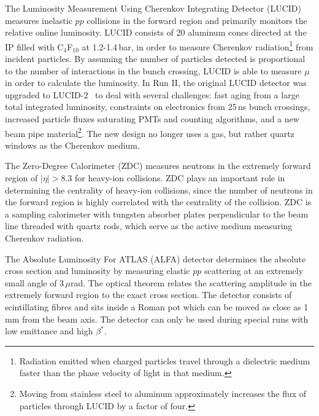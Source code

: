The Luminosity Measurement Using Cherenkov Integrating Detector (LUCID) measures inelastic $pp$ collisions in the forward region and primarily monitors the relative online luminosity.
LUCID consists of 20 aluminum cones directed at the IP filled with C$_4$F$_{10}$ at 1.2-1.4\,bar, in order to measure Cherenkov radiation\footnote{
	Radiation emitted when charged particles travel through a dielectric medium faster than the phase velocity of light in that medium.
} from incident particles. By assuming the number of particles detected is proportional to the number of interactions in the bunch crossing, LUCID is able to measure $\mu$ in order to calculate the luminosity.  In Run II, the original LUCID detector was upgraded to LUCID-2~\cite{LUCID_2} to deal with several challenges: fast aging from a large total integrated luminosity, constraints on electronics from 25\,ns bunch crossings, increased particle fluxes saturating PMTs and counting algorithms, and a new beam pipe material\footnote{
	Moving from stainless steel to aluminum approximately increases the flux of particles through LUCID by a factor of four.
}. The new design no longer uses a gas, but rather quartz windows as the Cherenkov medium.


The Zero-Degree Calorimeter (ZDC) measures neutrons in the extremely forward region of $|\eta|>8.3$ for heavy-ion collisions.
ZDC plays an important role in determining the centrality
of heavy-ion collisions, since the number of neutrons in the forward region is highly correlated with the centrality of the collision. ZDC is a sampling calorimeter with tungsten absorber plates perpendicular to the beam line threaded with quartz rods, which serve as the active medium measuring Cherenkov radiation. 

The Absolute Luminosity For ATLAS (ALFA) detector determines the absolute cross section and luminosity by measuring elastic $pp$ scattering at an extremely small angle of 3\,$\mu$rad. The optical theorem relates the scattering amplitude in the extremely forward region to the exact cross section. The detector consists of scintillating fibres and sits inside a Roman pot
which can be moved as close as 1\,mm from the beam axis. The detector can only be used during special runs with low emittance and high $\beta^{*}$.

